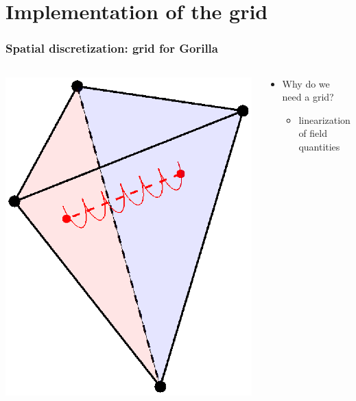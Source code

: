 \documentclass{beamer}
\begin{document}
\section{Implementation of the grid}

\begin{frame}
\frametitle{Spatial discretization: grid for \textbf{Gorilla}}
\vspace{-1cm}
\begin{columns}[onlytextwidth]
	\begin{column}{0.4\textwidth}
			\begin{center}
		\vspace{-0cm}
		\includegraphics[trim={5cm 1cm 0cm 0cm},clip,width=1\textwidth,right]{FIGURES/tetrahedron_guiding_center.eps}
	\end{center}	
	\end{column}
	\begin{column}{0.6\textwidth}

\begin{itemize}
\item Why do we need a grid?\\
\begin{itemize}
\item linearization of field quantities\\


\end{itemize}
\end{itemize}
\end{column}
\end{columns}
\end{frame}
\end{document}
